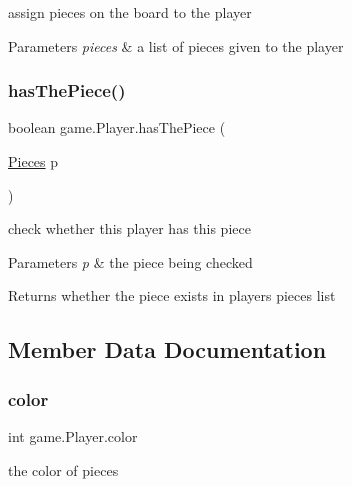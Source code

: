 assign pieces on the board to the player 
\begin{DoxyParams}{Parameters}
{\em pieces} & a list of pieces given to the player \\
\hline
\end{DoxyParams}
\mbox{\label{classgame_1_1_player_a7d2facf4888849be1ffcab77f12eccd5}} 
\subsubsection{\texorpdfstring{has\+The\+Piece()}{hasThePiece()}}
{\footnotesize\ttfamily boolean game.\+Player.\+has\+The\+Piece (\begin{DoxyParamCaption}\item[{\mbox{\hyperlink{classpieces_1_1_pieces}{Pieces}}}]{p }\end{DoxyParamCaption})\hspace{0.3cm}{\ttfamily [inline]}}

check whether this player has this piece 
\begin{DoxyParams}{Parameters}
{\em p} & the piece being checked \\
\hline
\end{DoxyParams}
\begin{DoxyReturn}{Returns}
whether the piece exists in player\textquotesingle{}s pieces list 
\end{DoxyReturn}


\subsection{Member Data Documentation}
\mbox{\label{classgame_1_1_player_a78e50f5f23d0c3f75abb86e1e9c6f63d}} 
\subsubsection{\texorpdfstring{color}{color}}
{\footnotesize\ttfamily int game.\+Player.\+color}

the color of pieces \mbox{\label{classgame_1_1_player_a55490a38f00ba09f4d6fab5ea6d57de7}} 
